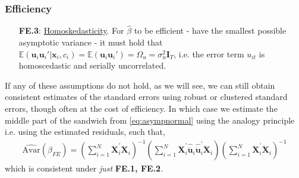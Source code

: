 \subsubsection*{Efficiency}

\begin{itemize}
    \item [\textbf{FE.3}:] \underline{Homoskedasticity}. For $\hat{\beta}$ to be efficient - have the smallest possible asymptotic variance - it must hold that $\mathbb{E}(\bm{u}_i \bm{u}_i' | \bm{x}_i, c_i) = \mathbb{E}(\bm{u}_i \bm{u}_i') = \Omega_{u} = \sigma^2_u \bm{I}_T$, i.e. the error term $u_{it}$ is homoscedastic and serially uncorrelated.    
\end{itemize}
If any of these assumptions do not hold, as we will see, we can still obtain consistent estimates of the standard errors using robust or clustered standard errors, though often at the cost of efficiency. In which case we estimate the middle part of the sandwich from \eqref{eq:asympnormal} using the analogy principle i.e. using the estimated residuals, such that, 
\begin{align*}
    \hat{\text{Avar}}(\hat{\beta}_{FE}) = \left( \sum_{i=1}^N \bm{\ddot{X}}_i^\prime \bm{\ddot{X}}_i \right)^{-1} \left( \sum_{i=1}^N \bm{\ddot{X}}_i^\prime \hat{\ddot{\bm{u}}}_i \hat{\ddot{\bm{u}}}_i^\prime \bm{\ddot{X}}_i \right) \left( \sum_{i=1}^N \bm{\ddot{X}}_i^\prime \bm{\ddot{X}}_i \right)^{-1}
\end{align*} 
which is consistent under \textit{just} \textbf{FE.1, FE.2}. 